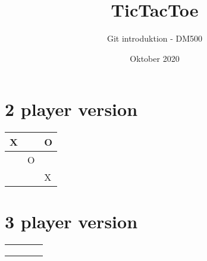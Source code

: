 \documentclass[20pt]{article}
\title{TicTacToe}
\author{Git introduktion - DM500}
\date{Oktober 2020}
\begin{document}
\maketitle

\section*{2 player version}

\setlength{\tabcolsep}{20pt}
\renewcommand{\arraystretch}{4}

\begin{table}[h]
\Large
    \centering
\begin{tabular}{ |m{2cm}|m{2cm}|m{2cm}|}
\hline

 X &   & O  \\ \hline
  & O &   \\ \hline
  &   & X  \\ \hline
\end{tabular}

\end{table}

\newpage

\section*{3 player version}

\setlength{\tabcolsep}{14pt}
\renewcommand{\arraystretch}{5}

\begin{table}[h]
\large
    \centering
\begin{tabular}{ |m{2cm}|m{2cm}|m{2cm}|m{2cm}|}
\hline
  &   &   &   \\ \hline
  &   &   &   \\ \hline
  &   &   &   \\ \hline
  &   &   &   \\ \hline

\end{tabular}

\end{table}
\end{document}
